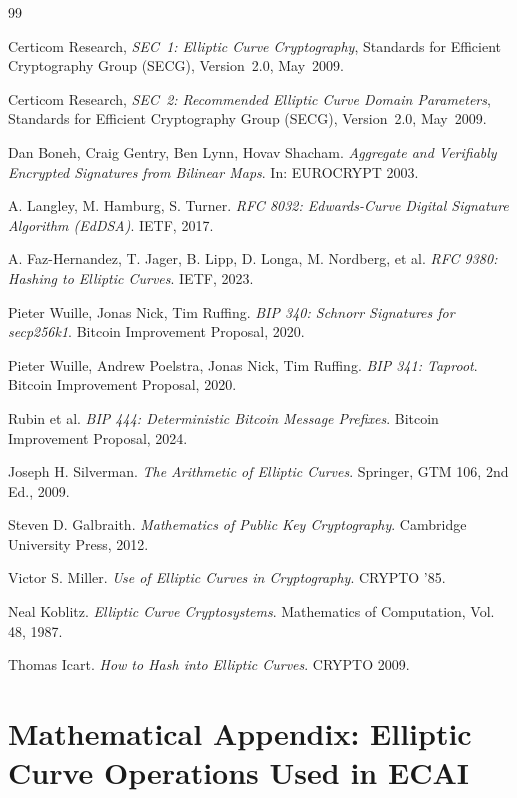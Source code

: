 \documentclass[11pt]{article}
\begin{document}
\begin{thebibliography}{99}

Certicom Research,
\textit{SEC~1: Elliptic Curve Cryptography},
Standards for Efficient Cryptography Group (SECG), Version~2.0, May~2009.

Certicom Research,
\textit{SEC~2: Recommended Elliptic Curve Domain Parameters},
Standards for Efficient Cryptography Group (SECG), Version~2.0, May~2009.

Dan Boneh, Craig Gentry, Ben Lynn, Hovav Shacham.  
\textit{Aggregate and Verifiably Encrypted Signatures from Bilinear Maps}.  
In: EUROCRYPT 2003.

A. Langley, M. Hamburg, S. Turner.  
\textit{RFC 8032: Edwards-Curve Digital Signature Algorithm (EdDSA)}.  
IETF, 2017.

A. Faz-Hernandez, T. Jager, B. Lipp, D. Longa, M. Nordberg, et al.  
\textit{RFC 9380: Hashing to Elliptic Curves}.  
IETF, 2023.

Pieter Wuille, Jonas Nick, Tim Ruffing.  
\textit{BIP 340: Schnorr Signatures for secp256k1}.  
Bitcoin Improvement Proposal, 2020.

Pieter Wuille, Andrew Poelstra, Jonas Nick, Tim Ruffing.  
\textit{BIP 341: Taproot}.  
Bitcoin Improvement Proposal, 2020.

Rubin et al.  
\textit{BIP 444: Deterministic Bitcoin Message Prefixes}.  
Bitcoin Improvement Proposal, 2024.

Joseph H. Silverman.  
\textit{The Arithmetic of Elliptic Curves}.  
Springer, GTM 106, 2nd Ed., 2009.

Steven D. Galbraith.  
\textit{Mathematics of Public Key Cryptography}.  
Cambridge University Press, 2012.

Victor S. Miller.  
\textit{Use of Elliptic Curves in Cryptography}.  
CRYPTO ’85.

Neal Koblitz.  
\textit{Elliptic Curve Cryptosystems}.  
Mathematics of Computation, Vol. 48, 1987.

Thomas Icart.  
\textit{How to Hash into Elliptic Curves}.  
CRYPTO 2009.

\end{thebibliography}
\appendix
\section{Mathematical Appendix: Elliptic Curve Operations Used in ECAI}
\end{document}
